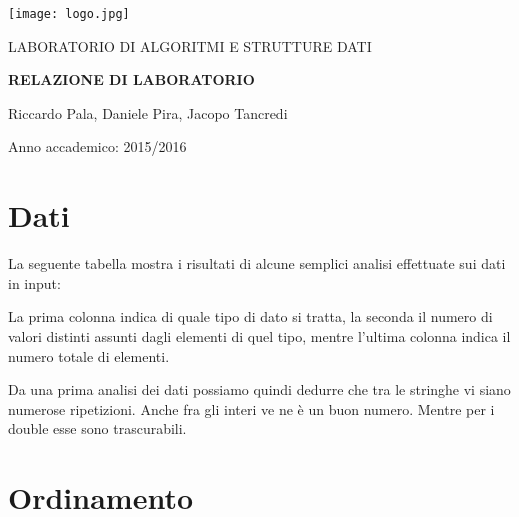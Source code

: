 \documentclass{report}
\begin{document}
\centerline {\texttt{[image: logo.jpg]}}

\vskip 1.2cm

\centerline {\normalsize {LABORATORIO DI ALGORITMI E STRUTTURE DATI}}

\vskip 0.7cm

\centerline {\Large {\bf RELAZIONE DI LABORATORIO}}

\vskip 1.7cm

\hfill  {Riccardo Pala, Daniele Pira, Jacopo Tancredi}

\vskip 2.7cm

\centerline{Anno accademico: 2015/2016}

\tableofcontents{}

\chapter{Dati}

La seguente tabella mostra i risultati di alcune semplici analisi effettuate sui dati in input:

\begin{table} [!htb]
\centering
{}
\end{table}

La prima colonna indica di quale tipo di dato si tratta, la seconda il numero di valori distinti assunti dagli elementi di quel tipo, mentre l'ultima colonna indica il numero totale di elementi.

Da una prima analisi dei dati possiamo quindi dedurre che tra le stringhe vi siano numerose ripetizioni. Anche fra gli interi ve ne è un buon numero. Mentre per i double esse sono trascurabili.

\chapter{Ordinamento}
\end{document}
